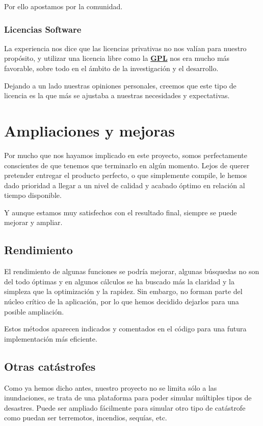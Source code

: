 Por ello apostamos por la comunidad.

\subsubsection*{Licencias Software}

La experiencia nos dice que las licencias privativas no nos valían para
nuestro propósito, y utilizar una licencia libre como la \hyperref[ap1]{\bf GPL}
nos era mucho más favorable, sobre todo en el ámbito de la investigación y el
desarrollo.

Dejando a un lado nuestras opiniones personales, creemos que este tipo de
licencia es la que más se ajustaba a nuestras necesidades y expectativas.

\section*{Ampliaciones y mejoras}

Por mucho que nos hayamos implicado en este proyecto, somos perfectamente
conscientes de que tenemos que terminarlo en algún momento. Lejos de querer
pretender entregar el producto perfecto, o que simplemente compile, le hemos
dado prioridad a llegar a un nivel de calidad y acabado óptimo en relación al
tiempo disponible.

Y aunque estamos muy satisfechos con el resultado final, siempre se puede
mejorar y ampliar.

\subsection*{Rendimiento}

El rendimiento de algunas funciones se podría mejorar, algunas búsquedas no son
del todo óptimas y en algunos cálculos se ha buscado más la claridad y la
simpleza que la optimización y la rapidez. Sin embargo, no forman parte del
núcleo crítico de la aplicación, por lo que hemos decidido dejarlos para una
posible ampliación. 

Estos métodos aparecen indicados y comentados en el código para una futura
implementación más eficiente.

\subsection*{Otras catástrofes}

Como ya hemos dicho antes, nuestro proyecto no se limita sólo a las
inundaciones, se trata de una plataforma para poder simular múltiples tipos de
desastres. Puede ser ampliado fácilmente para simular otro tipo de catástrofe
como puedan ser terremotos, incendios, sequías, etc.

